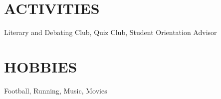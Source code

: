 \documentclass[margin]{res}
\begin{document}
\begin{resume}
\section{ACTIVITIES}
                Literary and Debating Club, Quiz Club, 
                Student Orientation Advisor 
                

 
\section{HOBBIES}         Football, Running, Music, Movies
 
\end{resume} 
\end{document}
